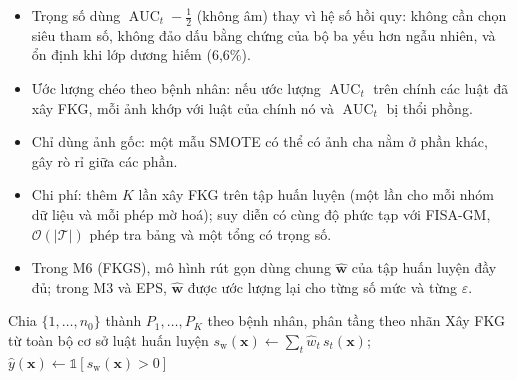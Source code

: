 \begin{nx}\label{nx:mm.fisagmw}
\begin{itemize}
  \item Trọng số dùng $\operatorname{AUC}_t-\tfrac12$ (không âm) thay vì hệ số hồi quy: không cần chọn siêu
        tham số, không đảo dấu bằng chứng của bộ ba yếu hơn ngẫu nhiên, và ổn định khi lớp dương hiếm (6,6\%).
  \item Ước lượng chéo theo bệnh nhân: nếu ước lượng $\operatorname{AUC}_t$ trên chính các luật đã xây FKG, mỗi ảnh
        khớp với luật của chính nó và $\operatorname{AUC}_t$ bị thổi phồng.
  \item Chỉ dùng ảnh gốc: một mẫu SMOTE có thể có ảnh cha nằm ở phần khác, gây rò rỉ giữa các phần.
  \item Chi phí: thêm $K$ lần xây FKG trên tập huấn luyện (một lần cho mỗi nhóm dữ liệu và mỗi phép mờ hoá);
        suy diễn có cùng độ phức tạp với FISA-GM, $\mathcal{O}(|\mathcal{T}|)$ phép tra bảng và một tổng có trọng số.
  \item Trong M6 (FKGS), mô hình rút gọn dùng chung $\hat{\mathbf w}$ của tập huấn luyện đầy đủ; trong M3 và EPS,
        $\hat{\mathbf w}$ được ước lượng lại cho từng số mức và từng $\varepsilon$.
\end{itemize}
\end{nx}

\begin{algorithm}[htbp]
\caption{FISA-GM-w}\label{alg:mm.fisagmw}
Chia $\{1,\dots,n_0\}$ thành $P_1,\dots,P_K$ theo bệnh nhân, phân tầng theo nhãn\;
Xây FKG từ toàn bộ cơ sở luật huấn luyện\;
$s_{\mathrm w}(\mathbf{x})\gets\sum_t \hat w_t\, s_t(\mathbf{x})$;\quad $\hat y(\mathbf{x})\gets\mathbb{1}[s_{\mathrm w}(\mathbf{x})>0]$\;
\end{algorithm}

